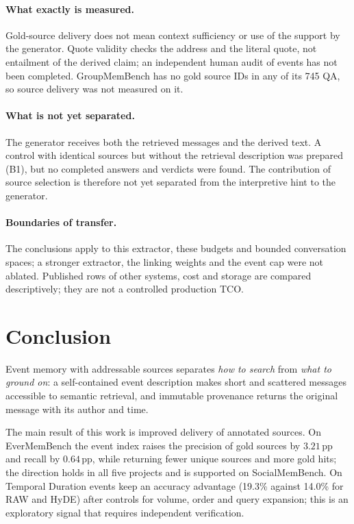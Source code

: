 \documentclass[11pt,a4paper]{article}
\newcommand{\pp}{\,\text{pp}}
\begin{document}
\paragraph{What exactly is measured.}
Gold-source delivery does not mean context sufficiency or use of the support by the
generator. Quote validity checks the address and the literal quote, not entailment
of the derived claim; an independent human audit of events has not been completed.
GroupMemBench has no gold source IDs in any of its 745 QA, so source delivery was not
measured on it.

\paragraph{What is not yet separated.}
The generator receives both the retrieved messages and the derived text. A control
with identical sources but without the retrieval description was prepared (B1), but
no completed answers and verdicts were found. The contribution of source selection is
therefore not yet separated from the interpretive hint to the generator.

\paragraph{Boundaries of transfer.}
The conclusions apply to this extractor, these budgets and bounded conversation
spaces; a stronger extractor, the linking weights and the event cap were not ablated.
Published rows of other systems, cost and storage are compared descriptively; they
are not a controlled production TCO.

\section{Conclusion}

Event memory with addressable sources separates \emph{how to search} from \emph{what to
ground on}: a self-contained event description makes short and scattered messages
accessible to semantic retrieval, and immutable provenance returns the original
message with its author and time.

The main result of this work is improved delivery of annotated sources. On
EverMemBench the event index raises the precision of gold sources by $3.21\pp$ and
recall by $0.64\pp$, while returning fewer unique sources and more gold hits; the
direction holds in all five projects and is supported on SocialMemBench. On Temporal
Duration events keep an accuracy advantage (19.3\% against 14.0\% for RAW and HyDE)
after controls for volume, order and query expansion; this is an exploratory signal
that requires independent verification.
\end{document}
